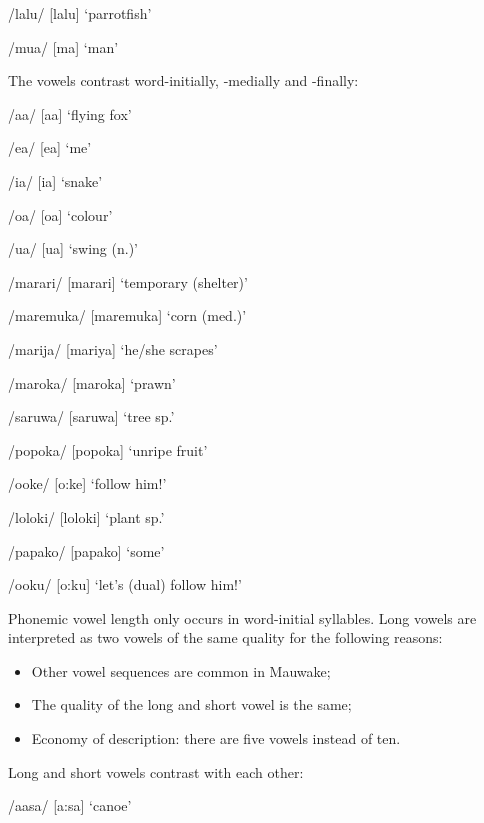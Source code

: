 /lalu/  [la{{\textprimstress}lu}]  `parrotfish'

/mua/  [m{\textupsilon{{\textprimstress}}}a]  `man'

The vowels contrast word-initially, -medially and -finally:

/a{\textphi}a/  [a{{\textprimstress}}{\textphi}a]  `flying fox'

/e{\textphi}a/  [e{{\textprimstress}}{\textphi}a]  `me'

/i{\textphi}a/  [i{{\textprimstress}}{\textphi}a]  `snake'

/o{\textphi}a/  [o{{\textprimstress}}{\textphi}a]  `colour'

/u{\textphi}a/  [u{{\textprimstress}}{\textphi}a]  `swing (n.)'

/marari/  [ma{{\textprimstress}rari}]  `temporary (shelter)'

/maremuka/  [ma{{\textprimstress}remuka}]  `corn (med.)'

/marija/  [ma{{\textprimstress}riya}]  `he/she scrapes'

/maroka/  [ma{{\textprimstress}roka}]  `prawn'

/saruwa/  [sa{{\textprimstress}ruwa}]  `tree sp.'

/popoka/  [po{{\textprimstress}poka}]  `unripe fruit'

/ooke/  [{{\textprimstress}o:ke}]  `follow him!'

/loloki/  [lo{{\textprimstress}loki}]  `plant sp.'

/papako/  [pa{{\textprimstress}pako}]  `some'

/ooku/  [{{\textprimstress}o:ku}]  `let's (dual) follow him!'

Phonemic vowel length only occurs in word-initial syllables.  Long vowels are interpreted as two vowels of the same quality for the following reasons:


\begin{itemize}
\item Other vowel sequences are common in Mauwake;

\item The quality of the long and short vowel is the same;

\item Economy of description: there are five vowels instead of ten.


\end{itemize}
Long and short vowels contrast with each other:

/aasa/  [{{\textprimstress}a:sa}]  `canoe'

